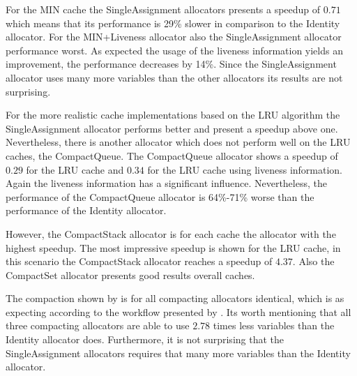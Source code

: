 \documentclass[onecolumn, openright, master, english, signatures]{dbrgrptt}
\begin{document}
For the \ac{MIN} cache the SingleAssignment allocators presents a speedup of $0.71$ which means that its performance is 29\% slower in comparison to the Identity allocator. For the \ac{MIN}+Liveness allocator also the SingleAssignment allocator performance worst. As expected the usage of the liveness information yields an improvement, the performance decreases by 14\%. Since the SingleAssignment allocator uses many more variables than the other allocators its results are not surprising.

For the more realistic cache implementations based on the \ac{LRU} algorithm the SingleAssignment allocator performs better and present a speedup above one. Nevertheless, there is another allocator which does not perform well on the \ac{LRU} caches, the CompactQueue. The CompactQueue allocator shows a speedup of $0.29$ for the \ac{LRU} cache and $0.34$ for the \ac{LRU} cache using liveness information. Again the liveness information has a significant influence. Nevertheless, the performance of the CompactQueue allocator is 64\%-71\% worse than the performance of the Identity allocator.

However, the CompactStack allocator is for each cache the allocator with the highest speedup. The most impressive speedup is shown for the \ac{LRU} cache, in this scenario the CompactStack allocator reaches a speedup of $4.37$. Also the CompactSet allocator presents good results overall caches.

The compaction shown by  is for all compacting allocators identical, which is as expecting according to the workflow presented by . Its worth mentioning that all three compacting allocators are able to use $2.78$ times less variables than the Identity allocator does. Furthermore, it is not surprising that the SingleAssignment allocators requires that many more variables than the Identity allocator.
\end{document}

